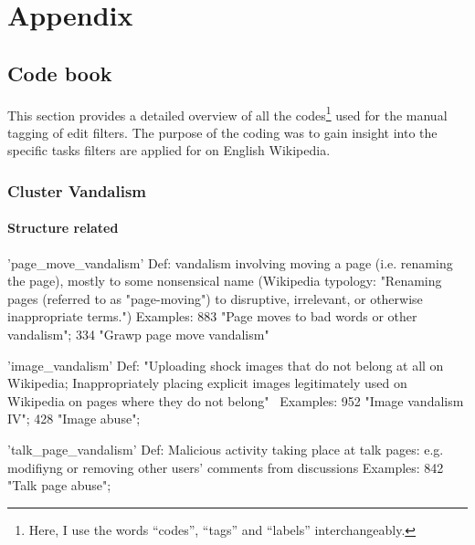 %

\chapter{Appendix}
\label{ch:Appendix}

\section{Code book}
\label{app:code_book}

This section provides a detailed overview of all the codes\footnote{Here, I use the words ``codes'', ``tags'' and ``labels'' interchangeably.} used for the manual tagging of edit filters.
The purpose of the coding was to gain insight into the specific tasks filters are applied for on English Wikipedia.


\subsection{Cluster Vandalism}

\subsubsection{Structure related}

'page\_move\_vandalism'
  Def: vandalism involving moving a page (i.e. renaming the page), mostly to some nonsensical name
  (Wikipedia typology: "Renaming pages (referred to as "page-moving") to disruptive, irrelevant, or otherwise inappropriate terms.")
  Examples: 883 "Page moves to bad words or other vandalism"; 334 "Grawp page move vandalism"

'image\_vandalism'
  Def: "Uploading shock images that do not belong at all on Wikipedia; Inappropriately placing explicit images legitimately used on Wikipedia on pages where they do not belong"~\cite{Wikipedia:VandalismTypes}
  Examples: 952 "Image vandalism IV"; 428 "Image abuse";

'talk\_page\_vandalism'
  Def: Malicious activity taking place at talk pages: e.g. modifiyng or removing other users' comments from discussions
  Examples: 842 "Talk page abuse";

